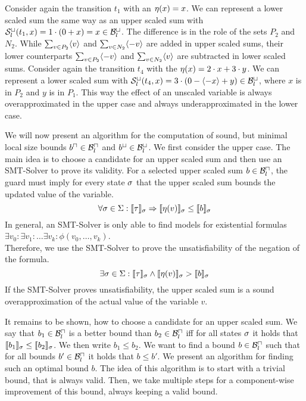 \begin{example}
  Consider again the transition $t_1$ with an $\eta(x) = x$.
  We can represent a lower scaled sum the same way as an upper scaled sum with ${\mathcal{S}^\sqcup_l}(t_1,x) = 1 \cdot (0 + x) = x \in \mathcal{B}^\sqcup_l$.
  The difference is in the role of the sets $P_2$ and $N_2$.
  While $\sum_{v \in P_2} \langle v\rangle$ and $\sum_{v \in N_2} \langle-v\rangle$ are added in upper scaled sums, their lower counterparts $\sum_{v \in P_2} \langle-v\rangle$ and $\sum_{v \in N_2} \langle v\rangle$ are subtracted in lower scaled sums.
  Consider again the transition $t_4$ with the $\eta(x) = 2 \cdot x + 3 \cdot y$.
  We can represent a lower scaled sum with ${\mathcal{S}^\sqcup_l}(t_4,x) = 3 \cdot (0 - \langle-x\rangle + y) \in \mathcal{B}^\sqcup_l$, where $x$ is in $P_2$ and $y$ is in $P_1$.  
  This way the effect of an unscaled variable is always overapproximated in the upper case and always underapproximated in the lower case.
\end{example}

We will now present an algorithm for the computation of sound, but minimal local size bounds $b^\sqcap \in \mathcal{B}^\sqcap_l$ and $b^\sqcup \in \mathcal{B}^\sqcup_l$.
We first consider the upper case.
The main idea is to choose a candidate for an upper scaled sum and then use an SMT-Solver to prove its validity.
For a selected upper scaled sum $b \in \mathcal{B}^\sqcap_l$, the guard must imply for every state $\sigma$ that the upper scaled sum bounds the updated value of the variable.
\[ \forall \sigma \in \Sigma: \llbracket \tau \rrbracket_{\sigma} \Rightarrow \llbracket \eta(v) \rrbracket_{\sigma} \leq \llbracket b \rrbracket_{\sigma} \]
In general, an SMT-Solver is only able to find models for existential formulas $\exists v_0: \exists v_1: \dots \exists v_k: \phi(v_0, \dots, v_k)$. \cite{smt} \\
Therefore, we use the SMT-Solver to prove the unsatisfiability of the negation of the formula.
\[ \exists \sigma \in \Sigma: \llbracket \tau \rrbracket_{\sigma} \wedge \llbracket \eta(v) \rrbracket_{\sigma} > \llbracket b \rrbracket_{\sigma} \]
If the SMT-Solver proves unsatisfiability, the upper scaled sum is a sound overapproximation of the actual value of the variable $v$.

It remains to be shown, how to choose a candidate for an upper scaled sum.
We say that $b_1 \in \mathcal{B}^\sqcap_l$ is a better bound than $b_2 \in \mathcal{B}^\sqcap_l$ iff for all states $\sigma$ it holds that $\llbracket b_1 \rrbracket_{\sigma} \leq \llbracket b_2 \rrbracket_{\sigma}$.
We then write $b_1 \leq b_2$.
We want to find a bound $b \in \mathcal{B}^\sqcap_l$ such that for all bounds $b' \in \mathcal{B}^\sqcap_l$ it holds that $b \leq b'$.
We present an algorithm for finding such an optimal bound $b$.
The idea of this algorithm is to start with a trivial bound, that is always valid.
Then, we take multiple steps for a component-wise improvement of this bound, always keeping a valid bound.

